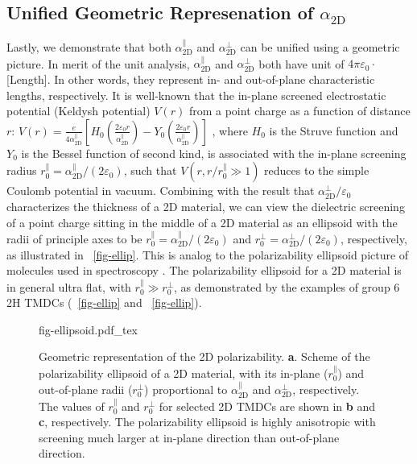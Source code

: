 \subsection{Unified Geometric Represenation of $\alpha_{\mathrm{2D}}$}
\label{sec:diel-unif-geom-repr}

%
Lastly, we demonstrate that both $\alpha_{\mathrm{2D}}^{\parallel}$
and $\alpha_{\mathrm{2D}}^{\perp}$ can be unified using a geometric
picture. In merit of the unit analysis,
$\alpha_{\mathrm{2D}}^{\parallel}$ and $\alpha_{\mathrm{2D}}^{\perp}$
both have unit of $4\pi\varepsilon_{0} \cdot$[Length]. In other words,
they represent in- and out-of-plane characteristic lengths,
respectively. It is well-known that the in-plane screened
electrostatic potential (Keldysh potential) $V(r)$ from a point charge
as a function of distance $r$:
$V(r) = {\displaystyle \frac{e}{4 \alpha_{\mathrm{2D}}^{\parallel}}}
\left[H_{0}({\displaystyle \frac{2\varepsilon_{0}
      r}{\alpha_{\mathrm{2D}}^{\parallel}}}) - Y_{0}( {\displaystyle
    \frac{2
      \varepsilon_{0}r}{\alpha_{\mathrm{2D}}^{\parallel}}})\right]$
\autocite{Keldysh_1979_eps_multi,Pulci_2014_exciton}, where $H_{0}$ is the Struve
function and $Y_{0}$ is the Bessel function of second kind, is
associated with the in-plane screening radius
$r_{0}^{\parallel}=\alpha_{\mathrm{2D}}^{\parallel}/(2
\varepsilon_{0})$, such that $V(r,r/r^{\parallel}_{0} \gg 1)$ reduces
to the simple Coulomb potential in vacuum. Combining with the result
that $\alpha_{\mathrm{2D}}^{\perp}/\varepsilon_{0}$ characterizes the
thickness of a 2D material, we can view the dielectric screening of a
point charge sitting in the middle of a 2D material as an ellipsoid
with the radii of principle axes to be
$r_{0}^{\parallel} = \alpha_{\mathrm{2D}}^{\parallel}/(2
\varepsilon_{0})$ and
$r_{0}^{\perp} = \alpha^{\perp}_{\mathrm{2D}}/(2 \varepsilon_{0})$,
respectively, as illustrated in ~\autoref{fig-ellip}.
This is analog to the polarizability ellipsoid picture of molecules
used in spectroscopy \autocite{Banwell_1994_spectro_book}. The polarizability ellipsoid
for a 2D material is in general ultra flat, with
$r_{0}^{\parallel} \gg r_{0}^{\perp}$, as demonstrated by the examples
of group 6 2H TMDCs (~\autoref{fig-ellip} and
~\autoref{fig-ellip}).
%
\begin{figure}[!htbp]
  \centering
  {fig-ellipsoid.pdf_tex}
  \caption{\label{fig-ellip} Geometric representation of the
      2D polarizability. \textbf{a}. Scheme of the polarizability
    ellipsoid of a 2D material, with its in-plane
    ($r_{0}^{\parallel}$) and out-of-plane radii
    ($r_{\mathrm{0}}^{\perp}$) proportional to
    $\alpha_{\mathrm{2D}}^{\parallel}$ and
    $\alpha_{\mathrm{2D}}^{\perp}$, respectively.  The values of
    $r_{0}^{\parallel}$ and $r_{0}^{\perp}$ for selected 2D TMDCs are
    shown in \textbf{b} and \textbf{c}, respectively.  The
    polarizability ellipsoid is highly anisotropic with screening much
    larger at in-plane direction than out-of-plane direction.}
\end{figure}

